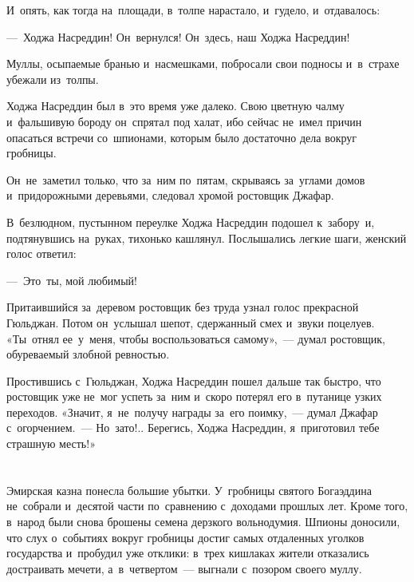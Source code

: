\documentclass[12pt,a4paper]{book}
\begin{document}
И~опять, как тогда на~площади, в~толпе нарастало, и~гудело, и~отдавалось:

—~Ходжа Насреддин! Он~вернулся! Он~здесь, наш Ходжа Насреддин!

Муллы, осыпаемые бранью и~насмешками, побросали свои подносы и~в~страхе убежали из~толпы.

Ходжа Насреддин был в~это время уже далеко. Свою цветную чалму и~фальшивую бороду он~спрятал под халат, ибо сейчас не~имел причин опасаться встречи со~шпионами, которым было достаточно дела вокруг гробницы.

Он~не~заметил только, что за~ним по~пятам, скрываясь за~углами домов и~придорожными деревьями, следовал хромой ростовщик Джафар.

В~безлюдном, пустынном переулке Ходжа Насреддин подошел к~забору~и, подтянувшись на~руках, тихонько кашлянул. Послышались легкие шаги, женский голос ответил:

—~Это~ты, мой любимый!

Притаившийся за~деревом ростовщик без труда узнал голос прекрасной Гюльджан. Потом он~услышал шепот, сдержанный смех и~звуки поцелуев. «Ты~отнял ее~у~меня, чтобы воспользоваться самому»,~— думал ростовщик, обуреваемый злобной ревностью.

Простившись с~Гюльджан, Ходжа Насреддин пошел дальше так быстро, что ростовщик уже не~мог успеть за~ним и~скоро потерял его в~путанице узких переходов. «Значит, я~не~получу награды за~его поимку,~— думал Джафар с~огорчением.~— Но~зато!.. Берегись, Ходжа Насреддин, я~приготовил тебе страшную месть!»


\chapter{}

Эмирская казна понесла большие убытки. У~гробницы святого Богаэддина не~собрали и~десятой части по~сравнению с~доходами прошлых лет. Кроме того, в~народ были снова брошены семена дерзкого вольнодумия. Шпионы доносили, что слух о~событиях вокруг гробницы достиг самых отдаленных уголков государства и~пробудил уже отклики: в~трех кишлаках жители отказались достраивать мечети, а~в~четвертом~— выгнали с~позором своего муллу.
\end{document}
